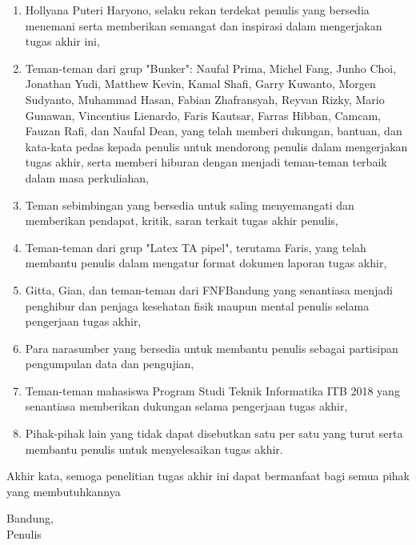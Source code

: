 \begin{enumerate}
  \item Hollyana Puteri Haryono, selaku rekan terdekat penulis yang bersedia menemani serta memberikan semangat dan inspirasi dalam mengerjakan tugas akhir ini,
  
  
  \item Teman-teman dari grup "Bunker": Naufal Prima, Michel Fang, Junho Choi, Jonathan Yudi, Matthew Kevin, Kamal Shafi, Garry Kuwanto, Morgen Sudyanto, Muhammad Hasan, Fabian Zhafransyah, Reyvan Rizky, Mario Gunawan, Vincentius Lienardo, Faris Kautsar, Farras Hibban, Camcam, Fauzan Rafi, dan Naufal Dean, yang telah memberi dukungan, bantuan, dan kata-kata pedas kepada penulis untuk mendorong penulis dalam mengerjakan tugas akhir, serta memberi hiburan dengan menjadi teman-teman terbaik dalam masa perkuliahan,
  
  \item Teman sebimbingan yang bersedia untuk saling menyemangati dan memberikan pendapat, kritik, saran terkait tugas akhir penulis,
  
  \item Teman-teman dari grup "Latex TA pipel", terutama Faris, yang telah membantu penulis dalam mengatur format dokumen laporan tugas akhir,
  
  \item Gitta, Gian, dan teman-teman dari FNFBandung yang senantiasa menjadi penghibur dan penjaga kesehatan fisik maupun mental penulis selama pengerjaan tugas akhir,
  
  \item Para narasumber yang bersedia untuk membantu penulis sebagai partisipan pengumpulan data dan pengujian,

  \item Teman-teman mahasiswa Program Studi Teknik Informatika ITB 2018 yang senantiasa memberikan dukungan selama pengerjaan tugas akhir,
   
  \item Pihak-pihak lain yang tidak dapat disebutkan satu per satu yang turut serta membantu penulis untuk menyelesaikan tugas akhir.
   
\end{enumerate}

Akhir kata, semoga penelitian tugas akhir ini dapat bermanfaat bagi semua pihak yang membutuhkannya

\vspace{1mm}

\begin{flushright}
  Bandung, \thedate \\
  \vspace{2.5cm}
  Penulis
\end{flushright}
\vfill
